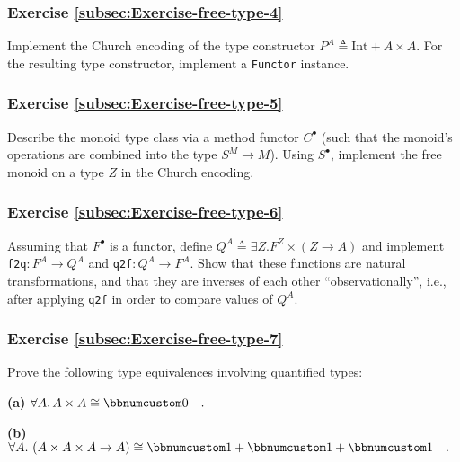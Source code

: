 \subsubsection{Exercise \label{subsec:Exercise-free-type-4}\ref{subsec:Exercise-free-type-4}}

Implement the Church encoding of the type constructor $P^{A}\triangleq\text{Int}+A\times A$.
For the resulting type constructor, implement a \lstinline!Functor!
instance.

\subsubsection{Exercise \label{subsec:Exercise-free-type-5}\ref{subsec:Exercise-free-type-5}}

Describe the monoid type class via a method functor $C^{\bullet}$
(such that the monoid\textsf{'}s operations are combined into the type $S^{M}\rightarrow M$).
Using $S^{\bullet}$, implement the free monoid on a type $Z$ in
the Church encoding.

\subsubsection{Exercise \label{subsec:Exercise-free-type-6}\ref{subsec:Exercise-free-type-6}}

Assuming that $F^{\bullet}$ is a functor, define $Q^{A}\triangleq\exists Z.F^{Z}\times\left(Z\rightarrow A\right)$
and implement \lstinline!f2q!$:F^{A}\rightarrow Q^{A}$
and \lstinline!q2f!$:Q^{A}\rightarrow F^{A}$.
Show that these functions are natural transformations, and that they
are inverses of each other \textsf{``}observationally\textsf{''}, i.e., after applying
\lstinline!q2f! in order
to compare values of $Q^{A}$.

\subsubsection{Exercise \label{subsec:Exercise-free-type-7}\ref{subsec:Exercise-free-type-7}}

Prove the following type equivalences involving quantified types:

\textbf{(a)} $\forall A.\,A\times A\cong\bbnum 0\quad.$

\textbf{(b)} $\forall A.\,\left(A\times A\times A\rightarrow A\right)\cong\bbnum 1+\bbnum 1+\bbnum 1\quad.$

